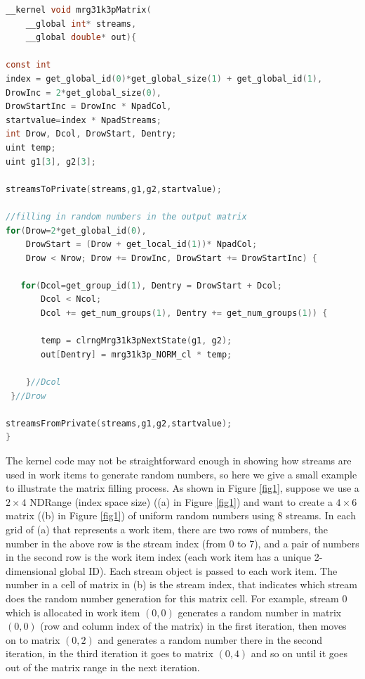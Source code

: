 \documentclass[article,nojss]{jss}\usepackage[]{graphicx}\usepackage[]{color}
\begin{document}
\begin{framed}
\begin{lstlisting}[language=C,basicstyle=\small,label=uniform]
 __kernel void mrg31k3pMatrix(
    __global int* streams,
    __global double* out){
 
const int 
index = get_global_id(0)*get_global_size(1) + get_global_id(1),
DrowInc = 2*get_global_size(0), 
DrowStartInc = DrowInc * NpadCol,
startvalue=index * NpadStreams;
int Drow, Dcol, DrowStart, Dentry;
uint temp;
uint g1[3], g2[3];

streamsToPrivate(streams,g1,g2,startvalue);
   
//filling in random numbers in the output matrix
for(Drow=2*get_global_id(0), 
    DrowStart = (Drow + get_local_id(1))* NpadCol;
    Drow < Nrow; Drow += DrowInc, DrowStart += DrowStartInc) {
   
   for(Dcol=get_group_id(1), Dentry = DrowStart + Dcol;
       Dcol < Ncol;
       Dcol += get_num_groups(1), Dentry += get_num_groups(1)) {
       
       temp = clrngMrg31k3pNextState(g1, g2);
       out[Dentry] = mrg31k3p_NORM_cl * temp;
       
    }//Dcol
 }//Drow
    
streamsFromPrivate(streams,g1,g2,startvalue);
}
\end{lstlisting}
\end{framed}

The kernel code may not be straightforward enough in showing how streams are used in work items to generate random numbers, so here we give a small example to illustrate the matrix filling process. As shown in Figure \ref{fig1}, suppose we use a $2 \times 4$ NDRange (index space size) ((a) in Figure \ref{fig1}) and want to create a $4 \times 6$ matrix ((b) in Figure \ref{fig1}) of uniform random numbers using 8 streams. In each grid of (a) that represents a work item, there are two rows of numbers, the number in the above row is the stream index (from 0 to 7), and a pair of numbers in the second row is the work item index (each work item has a unique 2-dimensional global ID). Each stream object is passed to each work item. The number in a cell of matrix in (b) is the stream index, that indicates which stream does the random number generation for this matrix cell. For example, stream 0 which is allocated in work item $(0,0)$ generates a random number in matrix $(0,0)$ (row and column index of the matrix) in the first iteration, then moves on to matrix $(0,2)$ and generates a random number there in the second iteration, in the third iteration it goes to matrix $(0,4)$ and so on until it goes out of the matrix range in the next iteration.
\end{document}
